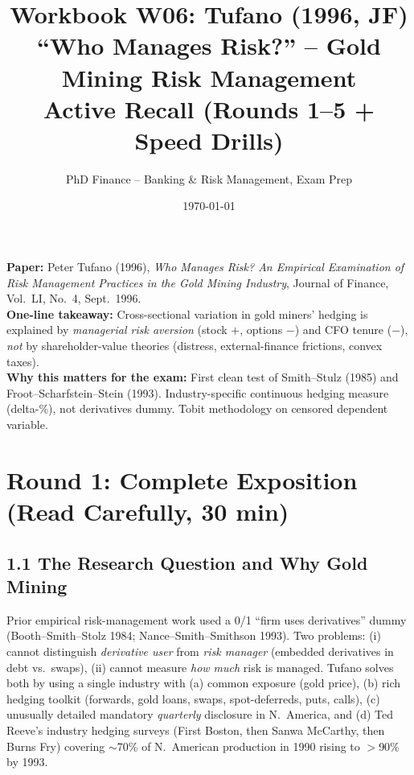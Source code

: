 \documentclass[11pt]{article}
\title{Workbook W06: Tufano (1996, JF) \\
``Who Manages Risk?'' -- Gold Mining Risk Management \\
\large Active Recall (Rounds 1--5 + Speed Drills)}
\author{PhD Finance -- Banking \& Risk Management, Exam Prep}
\date{\today}
\begin{document}
\maketitle

\begin{keybox}
\textbf{Paper:} Peter Tufano (1996), \emph{Who Manages Risk? An Empirical Examination of Risk Management Practices in the Gold Mining Industry}, Journal of Finance, Vol.\ LI, No.\ 4, Sept.\ 1996.\\[2pt]
\textbf{One-line takeaway:} Cross-sectional variation in gold miners' hedging is explained by \emph{managerial risk aversion} (stock $+$, options $-$) and CFO tenure ($-$), \emph{not} by shareholder-value theories (distress, external-finance frictions, convex taxes).\\[2pt]
\textbf{Why this matters for the exam:} First clean test of Smith--Stulz (1985) and Froot--Scharfstein--Stein (1993). Industry-specific continuous hedging measure (delta-\%), not derivatives dummy. Tobit methodology on censored dependent variable.
\end{keybox}

\section*{Round 1: Complete Exposition (Read Carefully, 30 min)}

\subsection*{1.1 The Research Question and Why Gold Mining}
Prior empirical risk-management work used a 0/1 ``firm uses derivatives'' dummy (Booth--Smith--Stolz 1984; Nance--Smith--Smithson 1993). Two problems: (i) cannot distinguish \emph{derivative user} from \emph{risk manager} (embedded derivatives in debt vs.\ swaps), (ii) cannot measure \emph{how much} risk is managed. Tufano solves both by using a single industry with (a) common exposure (gold price), (b) rich hedging toolkit (forwards, gold loans, swaps, spot-deferreds, puts, calls), (c) unusually detailed mandatory \emph{quarterly} disclosure in N.\ America, and (d) Ted Reeve's industry hedging surveys (First Boston, then Sanwa McCarthy, then Burns Fry) covering $\sim$70\% of N.\ American production in 1990 rising to $>$90\% by 1993.
\end{document}
